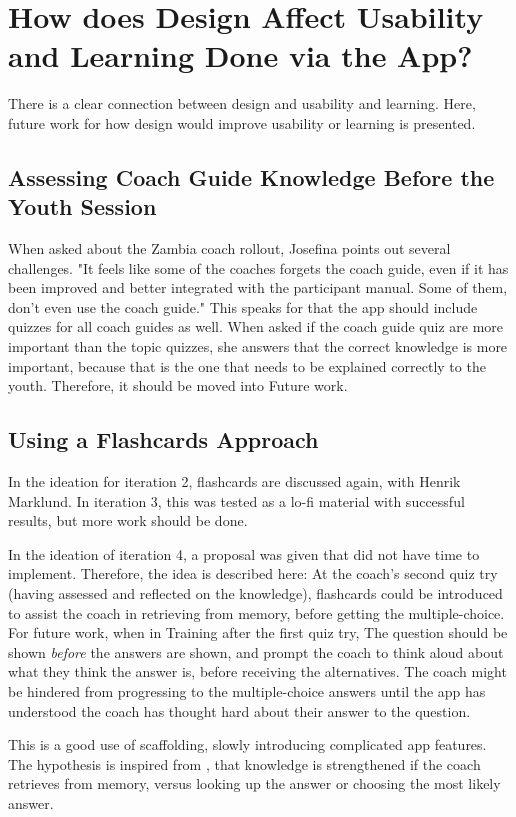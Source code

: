 \section{How does Design Affect Usability and Learning Done via the App?}\label{sec:future-work-4}

There is a clear connection between design and usability and learning. Here, future work for how design would improve usability or learning is presented.

\subsection{Assessing Coach Guide Knowledge Before the Youth Session}
When asked about the Zambia coach rollout, Josefina points out several challenges. "It feels like some of the coaches forgets the coach guide, even if it has been improved and better integrated with the participant manual. Some of them, don't even use the coach guide." This speaks for that the app should include quizzes for all coach guides as well. When asked if the coach guide quiz are more important than the topic quizzes, she answers that the correct knowledge is more important, because that is the one that needs to be explained correctly to the youth. Therefore, it should be moved into Future work.

\subsection{Using a Flashcards Approach}
In the ideation for iteration 2, flashcards are discussed again, with Henrik Marklund. In iteration 3, this was tested as a lo-fi material with successful results, but more work should be done.

In the ideation of iteration 4, a proposal was given that did not have time to implement. Therefore, the idea is described here: At the coach's second quiz try (having assessed and reflected on the knowledge), flashcards could be introduced to assist the coach in retrieving from memory, before getting the multiple-choice. For future work, when in Training after the first quiz try, The question should be shown \textit{before} the answers are shown, and prompt the coach to think aloud about what they think the answer is, before receiving the alternatives. The coach might be hindered from progressing to the multiple-choice answers until the app has understood the coach has thought hard about their answer to the question.

This is a good use of scaffolding, slowly introducing complicated app features. The hypothesis is inspired from \cite{bjork}, that knowledge is strengthened if the coach retrieves from memory, versus looking up the answer or choosing the most likely answer.

